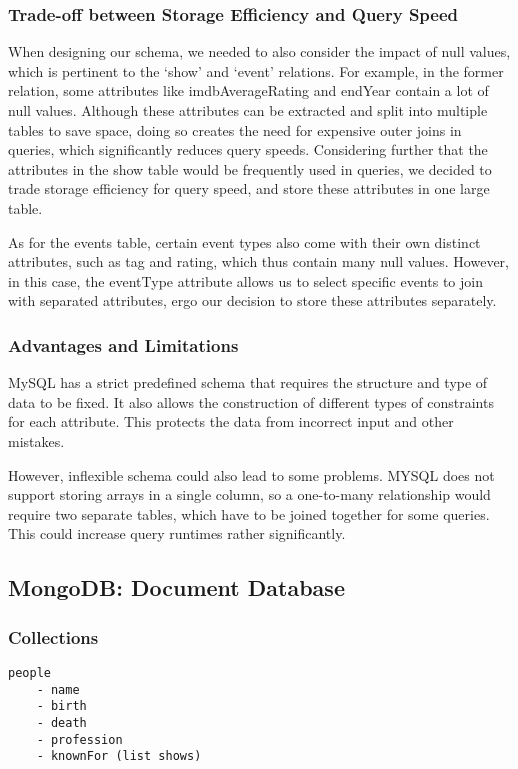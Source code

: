 \documentclass[10pt,titlepage]{article}
\begin{document}
\subsubsection{Trade-off between Storage Efficiency and Query Speed}
When designing our schema, we needed to also consider the impact of null values, which is pertinent to the `show' and `event' relations. For example, in the former relation, some attributes like imdbAverageRating and endYear contain a lot of null values. Although these attributes can be extracted and split into multiple tables to save space, doing so creates the need for expensive outer joins  in queries, which significantly reduces query speeds. Considering further that the attributes in the show table would be frequently used in queries, we decided to trade storage efficiency for query speed, and store these attributes in one large table. 

As for the events table, certain event types also come with their own distinct attributes, such as tag and rating, which thus contain many null values. However, in this case, the eventType attribute allows us to select specific events to join with separated attributes, ergo our decision to store these attributes separately.



\subsubsection{Advantages and Limitations}
MySQL has a strict predefined schema that requires the structure and type of data to be fixed. It also allows the construction of different types of constraints for each attribute. This protects the data from incorrect input and other mistakes.

However, inflexible schema could also lead to some problems. MYSQL does not support storing arrays in a single column, so a one-to-many relationship would require two separate tables, which have to be joined together for some queries. This could increase query runtimes rather significantly.

\pagebreak
\subsection{MongoDB: Document Database}
\subsubsection{Collections}

\begin{lstlisting}
people
    - name
    - birth
    - death
    - profession
    - knownFor (list shows)
\end{lstlisting}
\end{document}
